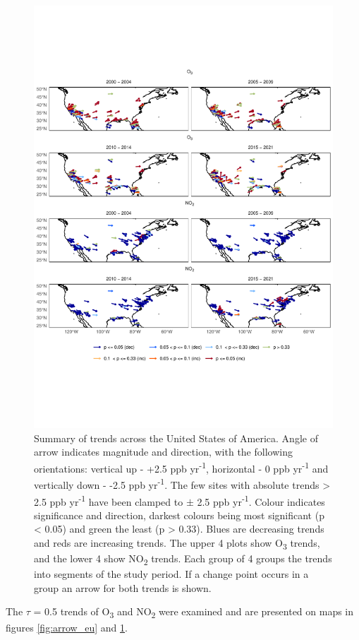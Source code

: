 \documentclass[journal abbreviation, manuscript]{copernicus}
\begin{document}
\begin{figure}[p]
\includegraphics[width=12cm]{figures/f4_usa_arrows.pdf}
\caption{Summary of trends across the United States of America. Angle of arrow indicates magnitude and direction, with the following orientations: vertical up - +2.5 ppb yr\textsuperscript{-1}, horizontal - 0 ppb yr\textsuperscript{-1} and vertically down - -2.5 ppb yr\textsuperscript{-1}. The few sites with absolute trends > 2.5 ppb yr\textsuperscript{-1} have been clamped to $\pm$ 2.5 ppb yr\textsuperscript{-1}. Colour indicates significance and direction, darkest colours being most significant (p < 0.05) and green the least (p > 0.33). Blues are decreasing trends and reds are increasing trends. The upper 4 plots show O\textsubscript{3} trends, and the lower 4 show NO\textsubscript{2} trends. Each group of 4 groups the trends into segments of the study period. If a change point occurs in a group an arrow for both trends is shown.}
\label{fig:arrow_us}
\end{figure}

The $\tau$ = 0.5 trends of O\textsubscript{3} and NO\textsubscript{2} were examined and are presented on maps in figures \ref{fig:arrow_eu} and \ref{fig:arrow_us}.
\end{document}
